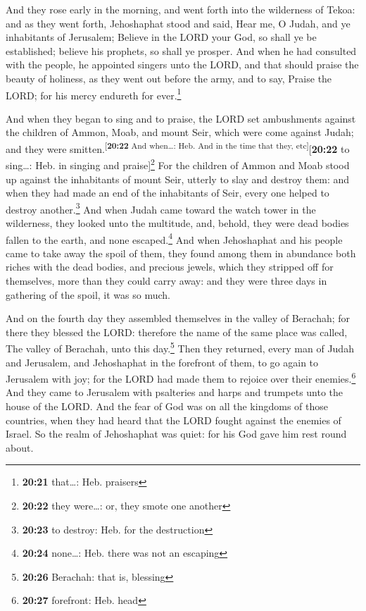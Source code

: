  And they rose early in the morning, and went forth into
the wilderness of Tekoa: and as they went forth, Jehoshaphat stood and
said, Hear me, O Judah, and ye inhabitants of Jerusalem; Believe in the
LORD your God, so shall ye be established; believe his prophets, so
shall ye prosper.  And when he had consulted with the
people, he appointed singers unto the LORD, and that should praise the
beauty of holiness, as they went out before the army, and to say, Praise
the LORD; for his mercy endureth for ever.\footnote{\textbf{20:21}
  that\ldots: Heb. praisers}

 And when they began to sing and to praise, the LORD set
ambushments against the children of Ammon, Moab, and mount Seir, which
were come against Judah; and they were
smitten.\textsuperscript{{[}\textbf{20:22} And when\ldots: Heb. And in
the time that they, etc{]}}{[}\textbf{20:22} to sing\ldots: Heb. in
singing and praise{]}\footnote{\textbf{20:22} they were\ldots: or, they
  smote one another}  For the children of Ammon and Moab
stood up against the inhabitants of mount Seir, utterly to slay and
destroy them: and when they had made an end of the inhabitants of Seir,
every one helped to destroy another.\footnote{\textbf{20:23} to destroy:
  Heb. for the destruction}  And when Judah came toward
the watch tower in the wilderness, they looked unto the multitude, and,
behold, they were dead bodies fallen to the earth, and none
escaped.\footnote{\textbf{20:24} none\ldots: Heb. there was not an
  escaping}  And when Jehoshaphat and his people came to
take away the spoil of them, they found among them in abundance both
riches with the dead bodies, and precious jewels, which they stripped
off for themselves, more than they could carry away: and they were three
days in gathering of the spoil, it was so much.

 And on the fourth day they assembled themselves in the
valley of Berachah; for there they blessed the LORD: therefore the name
of the same place was called, The valley of Berachah, unto this
day.\footnote{\textbf{20:26} Berachah: that is, blessing}
 Then they returned, every man of Judah and Jerusalem,
and Jehoshaphat in the forefront of them, to go again to Jerusalem with
joy; for the LORD had made them to rejoice over their
enemies.\footnote{\textbf{20:27} forefront: Heb. head} 
And they came to Jerusalem with psalteries and harps and trumpets unto
the house of the LORD.  And the fear of God was on all
the kingdoms of those countries, when they had heard that the LORD
fought against the enemies of Israel.  So the realm of
Jehoshaphat was quiet: for his God gave him rest round about.

